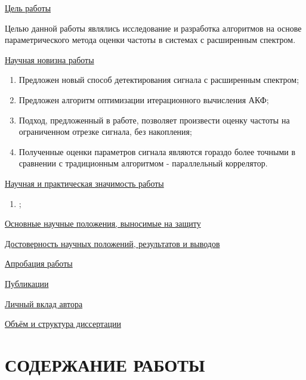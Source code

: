 \underline{Цель работы}

Целью данной работы являлись исследование и разработка алгоритмов на основе параметрического метода оценки частоты в системах 
с расширенным спектром.

\underline{Научная новизна работы}
\begin{enumerate}
      \item {Предложен новый способ детектирования сигнала с расширенным спектром;}
      \item {Предложен алгоритм оптимизации итерационного вычисления АКФ;}
      \item {Подход, предложенный в работе, позволяет произвести оценку частоты на ограниченном отрезке сигнала, без накопления;}
      \item {Полученные оценки параметров сигнала являются гораздо более точными в сравнении с традиционным алгоритмом - 
      		параллельный коррелятор.}
\end{enumerate}

\underline{Научная и практическая значимость работы}
\begin{enumerate}
      \item {;}
\end{enumerate}

\underline{Основные научные положения, выносимые на защиту}

\underline{Достоверность научных положений, результатов и выводов}

\underline{Апробация работы}

\underline{Публикации}

\underline{Личный вклад автора}

\underline{Объём и структура диссертации}

\section*{СОДЕРЖАНИЕ РАБОТЫ}







